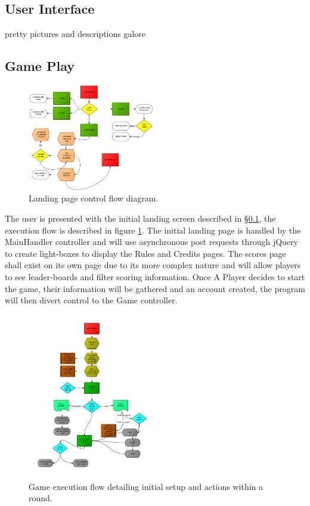 \documentclass[12pt]{IEEEtran}
\begin{document}
\subsection{User Interface}
\label{subsec:ui}

pretty pictures and descriptions galore

\subsection{Game Play}
\label{subsec:gameplay}

	\begin{figure}[h]
		\centering
		\includegraphics[width=0.5\textwidth]{landingpage.png}
		\caption{Landing page control flow diagram. }
		\label{fig:landingpage}
	\end{figure}

	The user is presented with the initial landing screen described in \S\ref{subsec:ui}, the execution flow is described in figure \ref{fig:landingpage}. The initial landing page is handled by the MainHandler controller and will use asynchronous post requests through jQuery to create light-boxes to display the Rules and Credits pages. The scores page shall exist on its own page due to its more complex nature and will allow players to see leader-boards and filter scoring information. Once A Player decides to start the game, their information will be gathered and an account created, the program will then divert control to the Game controller.

	\begin{figure}[h]
		\centering
		\includegraphics[width=0.5\textwidth]{gameplay.png}
		\caption{Game execution flow detailing initial setup and actions within a round. }
		\label{fig:gameplay}
	\end{figure}
\end{document}
